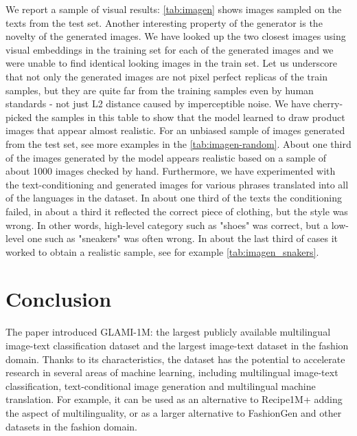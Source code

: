 \documentclass{bmvc2k}
\begin{document}
We report a sample of visual results: \autoref{tab:imagen} shows images sampled on the texts from the test set. Another interesting property of the generator is the novelty of the generated images. We have looked up the two closest images using visual embeddings in the training set for each of the generated images and we were unable to find identical looking images in the train set. Let us underscore that not only the generated images are not pixel perfect replicas of the train samples, but they are quite far from the training samples even by human standards - not just L2 distance caused by imperceptible noise. We have cherry-picked the samples in this table to show that the model learned to draw product images that appear almost realistic. For an unbiased sample of images generated from the test set, see more examples in the \autoref{tab:imagen-random}.
About one third of the images generated by the model appears realistic based on a sample of about 1000 images checked by hand. Furthermore, we have experimented with the text-conditioning and generated images for various phrases translated into all of the languages in the dataset. In about one third of the texts the conditioning failed, in about a third it reflected the correct piece of clothing, but the style was wrong. In other words, high-level category such as "shoes" was correct, but a low-level one such as "sneakers" was often wrong. In about the last third of cases it worked to obtain a realistic sample, see for example \autoref{tab:imagen_snakers}. 









\section{Conclusion}

The paper introduced GLAMI-1M: the largest publicly available multilingual image-text classification dataset and the largest image-text dataset in the fashion domain. 
Thanks to its characteristics, the dataset has the potential to accelerate research in several areas of machine learning, including multilingual image-text classification, text-conditional image generation and multilingual machine translation. For example, it can be used as an alternative to Recipe1M+ \cite{recipe1m+} adding the aspect of multilinguality, or as a larger alternative to FashionGen \cite{fashiongen} and other datasets in the fashion domain.
\end{document}
